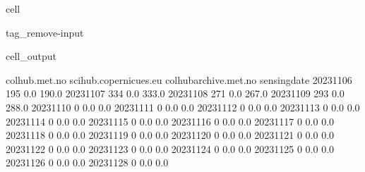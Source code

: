 \documentclass[letterpaper,10pt,english]{jupyterBook}
\begin{document}
\begin{sphinxuseclass}{cell}
\begin{sphinxuseclass}{tag_remove-input}\begin{sphinxVerbatimOutput}

\begin{sphinxuseclass}{cell_output}
\begin{sphinxVerbatim}[commandchars=\\\{\}]
              colhub.met.no  scihub.copernicues.eu  colhub\PYGZhy{}archive.met.no  \PYGZbs{}
sensing\PYGZus{}date                                                                
2023\PYGZhy{}11\PYGZhy{}06              195                    0.0                  190.0   
2023\PYGZhy{}11\PYGZhy{}07              334                    0.0                  333.0   
2023\PYGZhy{}11\PYGZhy{}08              271                    0.0                  267.0   
2023\PYGZhy{}11\PYGZhy{}09              293                    0.0                  288.0   
2023\PYGZhy{}11\PYGZhy{}10                0                    0.0                    0.0   
2023\PYGZhy{}11\PYGZhy{}11                0                    0.0                    0.0   
2023\PYGZhy{}11\PYGZhy{}12                0                    0.0                    0.0   
2023\PYGZhy{}11\PYGZhy{}13                0                    0.0                    0.0   
2023\PYGZhy{}11\PYGZhy{}14                0                    0.0                    0.0   
2023\PYGZhy{}11\PYGZhy{}15                0                    0.0                    0.0   
2023\PYGZhy{}11\PYGZhy{}16                0                    0.0                    0.0   
2023\PYGZhy{}11\PYGZhy{}17                0                    0.0                    0.0   
2023\PYGZhy{}11\PYGZhy{}18                0                    0.0                    0.0   
2023\PYGZhy{}11\PYGZhy{}19                0                    0.0                    0.0   
2023\PYGZhy{}11\PYGZhy{}20                0                    0.0                    0.0   
2023\PYGZhy{}11\PYGZhy{}21                0                    0.0                    0.0   
2023\PYGZhy{}11\PYGZhy{}22                0                    0.0                    0.0   
2023\PYGZhy{}11\PYGZhy{}23                0                    0.0                    0.0   
2023\PYGZhy{}11\PYGZhy{}24                0                    0.0                    0.0   
2023\PYGZhy{}11\PYGZhy{}25                0                    0.0                    0.0   
2023\PYGZhy{}11\PYGZhy{}26                0                    0.0                    0.0   
2023\PYGZhy{}11\PYGZhy{}28                0                    0.0                    0.0   

\end{sphinxVerbatim}
\end{sphinxuseclass}
\end{sphinxVerbatimOutput}
\end{sphinxuseclass}
\end{sphinxuseclass}
\end{document}
